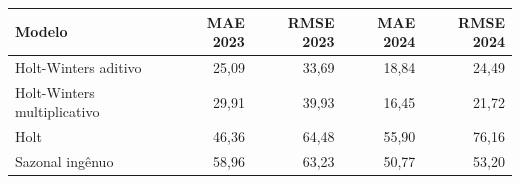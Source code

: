 \begin{tabular}{lrrrr}
\toprule
Modelo & MAE 2023 & RMSE 2023 & MAE 2024 & RMSE 2024 \\
\midrule
Holt-Winters aditivo & 25,09 & 33,69 & 18,84 & 24,49 \\
Holt-Winters multiplicativo & 29,91 & 39,93 & 16,45 & 21,72 \\
Holt & 46,36 & 64,48 & 55,90 & 76,16 \\
Sazonal ingênuo & 58,96 & 63,23 & 50,77 & 53,20 \\
\bottomrule
\end{tabular}
